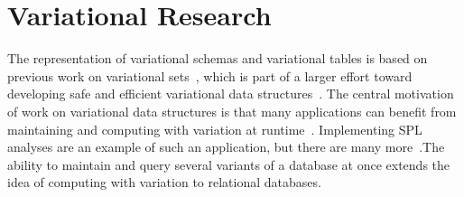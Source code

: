 \section{Variational Research}
\label{sec:varresearch}

The representation of variational schemas and variational tables is based on previous
work on variational sets~\cite{EWC13fosd}, which is part of a larger effort
toward developing safe and efficient variational data
structures~\cite{Walk14onward,MMWWK17vamos}. The central motivation of work on
variational data structures is that many applications can benefit from
maintaining and computing with variation at
runtime~\cite{EW11gttse,CEW16ecoop}. Implementing SPL analyses
are an example of such an application, but there are many
more~\cite{Walk14onward}.The ability to maintain and query several
variants of a database at once extends the idea of computing with variation to
relational databases.


